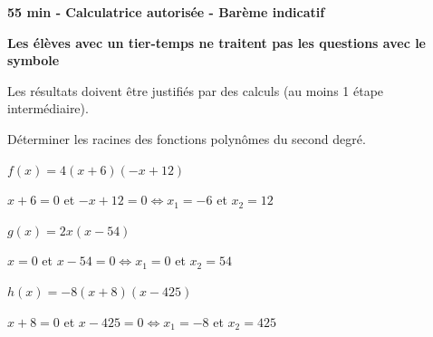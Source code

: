 \documentclass[12pt,a4paper]{article}  %
\begin{document}
\begin{center}

\end{center}




\begin{center}\textbf{55 min - Calculatrice autorisée - Barème indicatif}\end{center}

\begin{center}\textbf{Les élèves avec un tier-temps ne traitent pas les questions avec  le symbole }\end{center}

\begin{center}
Les résultats doivent être justifiés par des calculs (au moins 1 étape intermédiaire).
\end{center}
\vspace{.05cm} 


Déterminer les racines des fonctions polynômes du second degré.
\begin{enumMet}
    \item {} $f(x)=4(x+6)(-x+12)$\\
    \begin{corrBox}
        $x+6=0$ et $-x+12=0 \iff x_1=-6$ et $x_2=12$
    \end{corrBox}
    \item $g(x)=2x(x-54)$\\
    \begin{corrBox}
        $x=0$ et $x-54=0 \iff x_1=0$ et $x_2=54$
    \end{corrBox}
    \item $h(x)=-8(x+8)(x-425)$\\
    \begin{corrBox}
        $ x+8=0$ et $x-425=0 \iff x_1=-8$ et $x_2=425$
    \end{corrBox}
\end{enumMet}
\end{document}
